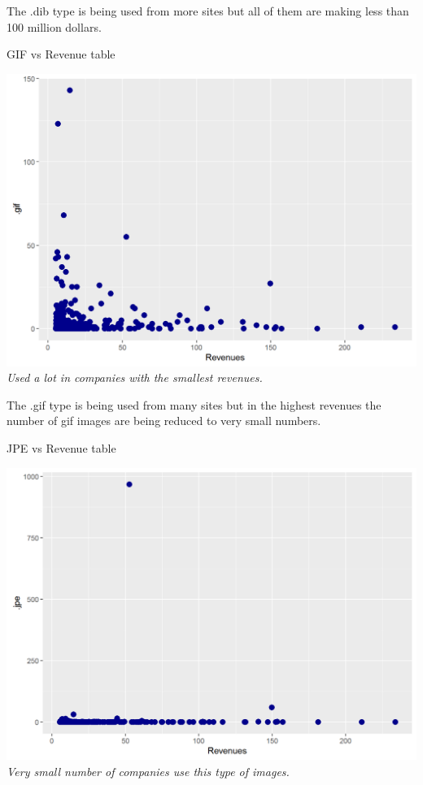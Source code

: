 \documentclass{book}
\begin{document}
The .dib type is being used from more sites but all of them are making less than 100 million dollars.
\begin{table}[H]
\centering
\caption{GIF vs Revenue table}
\begin{center}
\includegraphics[scale=0.5]{../R/photos/56_gif_rev.png}    \\
\textit{Used a lot in companies with the smallest revenues.}
\end{center}
\end{table}
The .gif type is being used from many sites but in the highest revenues the number of gif images are being reduced to very small numbers.
\begin{table}[H]
\centering
\caption{JPE vs Revenue table}
\begin{center}
\includegraphics[scale=0.5]{../R/photos/57_jpe_rev.png}    \\
\textit{Very small number of companies use this type of images.}
\end{center}
\end{table}
\end{document}
